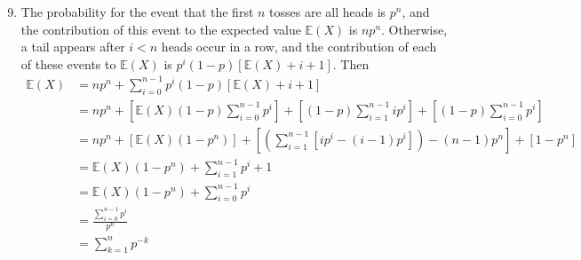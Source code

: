\documentclass[a4paper,12pt]{article}
\begin{document}
\begin{enumerate}
    \setcounter{enumi}{8}
    \item The probability for the event that the first $n$ tosses are all heads is $p^n$, and the contribution of this event to the expected value $\mathbb{E}(X)$ is $np^n$. Otherwise, a tail appears after $i < n$ heads occur in a row, and the contribution of each of these events to $\mathbb{E}(X)$ is $p^i (1 - p) [\mathbb{E}(X) + i + 1]$. Then
        \begin{align*}
            \mathbb{E}(X) &= np^n + \sum_{i = 0}^{n - 1} p^i (1 - p) [\mathbb{E}(X) + i + 1] \\
            &= np^n + \left[ \mathbb{E}(X) (1 - p) \sum_{i = 0}^{n - 1} p^i \right] + \left[ (1 - p) \sum_{i = 1}^{n - 1} ip^i \right] + \left[ (1 - p) \sum_{i = 0}^{n - 1} p^i \right] \\
            &= np^n + [\mathbb{E}(X) (1 - p^n)] + \left[ \left( \sum_{i = 1}^{n - 1} [ip^i - (i - 1)p^i ] \right) - (n - 1)p^n \right] + [1 - p^n] \\
            &= \mathbb{E}(X) (1 - p^n) + \sum_{i = 1}^{n - 1} p^i + 1 \\
            &= \mathbb{E}(X) (1 - p^n) + \sum_{i = 0}^{n - 1} p^i \\
            &= \frac{\sum_{i = 0}^{n - 1} p^i}{p^n} \\
            &= \sum_{k = 1}^{n} p^{-k}
        \end{align*}

\end{enumerate}
\end{document}
